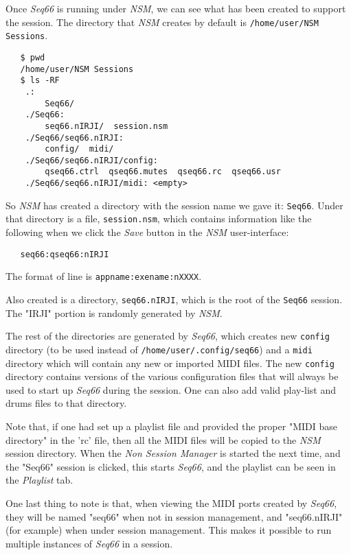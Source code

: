 	Once \textsl{Seq66} is running under \textsl{NSM}, we can see what has
   been created to support the session.  The directory that \textsl{NSM}
   creates by default is \texttt{/home/user/NSM Sessions}.

\begin{verbatim}
   $ pwd
   /home/user/NSM Sessions
   $ ls -RF
	.:
		Seq66/
	./Seq66:
		seq66.nIRJI/  session.nsm
	./Seq66/seq66.nIRJI:
		config/  midi/
	./Seq66/seq66.nIRJI/config:
		qseq66.ctrl  qseq66.mutes  qseq66.rc  qseq66.usr
	./Seq66/seq66.nIRJI/midi: <empty>
\end{verbatim}

	So \textsl{NSM} has created a directory with the session name we gave it:
   \texttt{Seq66}.  Under that directory is a file, \texttt{session.nsm}, which
   contains information like the following when we click the \textsl{Save}
   button in the \textsl{NSM} user-interface:

\begin{verbatim}
   seq66:qseq66:nIRJI
\end{verbatim}

   The format of line is \texttt{appname:exename:nXXXX}.

   Also created is a directory, \texttt{seq66.nIRJI}, which is the root of the
   \texttt{Seq66} session.  The "IRJI" portion is randomly generated by
   \textsl{NSM}.

   The rest of the directories are generated by \textsl{Seq66}, which creates
   new \texttt{config} directory (to be used instead of
   \texttt{/home/user/.config/seq66}) and a \texttt{midi} directory which will
   contain any new or imported MIDI files.  The new \texttt{config} directory
   contains versions of the various configuration files that will always be
   used to start up \textsl{Seq66} during the session.  One can also add valid
   play-list and drums files to that directory.

   Note that, if one had set up a playlist file and provided the proper "MIDI
   base directory" in the 'rc' file, then all the MIDI files will be copied to
   the \textsl{NSM} session directory.
   When the \textsl{Non Session Manager} is started the next time, and the
   "Seq66" session is clicked, this starts \textsl{Seq66}, and the playlist can
   be seen in the \textsl{Playlist} tab.

   One last thing to note is that, when viewing the MIDI ports created by
   \textsl{Seq66}, they will be named "seq66" when not in session management,
   and "seq66.nIRJI" (for example) when under session management.  This makes
   it possible to run multiple instances of \textsl{Seq66} in a session.

